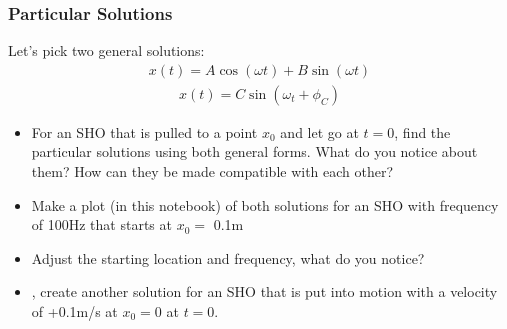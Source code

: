 \documentclass[letterpaper,10pt,english]{jupyterBook}
\begin{document}
\subsubsection{Particular Solutions}
\label{\detokenize{content/2_oscillations/activity-SHO_and_dynamical_systems:particular-solutions}}
\sphinxAtStartPar
Let’s pick two general solutions:
\begin{equation*}
\begin{split}x(t) = A\cos(\omega t) + B\sin(\omega t)\end{split}
\end{equation*}\begin{equation*}
\begin{split}x(t) = C\sin(\omega_t + \phi_C)\end{split}
\end{equation*}
\sphinxAtStartPar
{}
\begin{itemize}
\item {} 
\sphinxAtStartPar
For an SHO that is pulled to a point \(x_0\) and let go at \(t=0\), find the particular solutions using both general forms.  What do you notice about them? How can they be made compatible with each other?

\item {} 
\sphinxAtStartPar
Make a plot (in this notebook) of both solutions for an SHO with frequency of 100Hz that starts at \(x_0 =\) 0.1m

\item {} 
\sphinxAtStartPar
Adjust the starting location and frequency, what do you notice?

\item {} 
\sphinxAtStartPar
{}, create another solution for an SHO that is put into motion with a velocity of +0.1m/s at \(x_0=0\) at \(t=0\).

\end{itemize}
\end{document}
